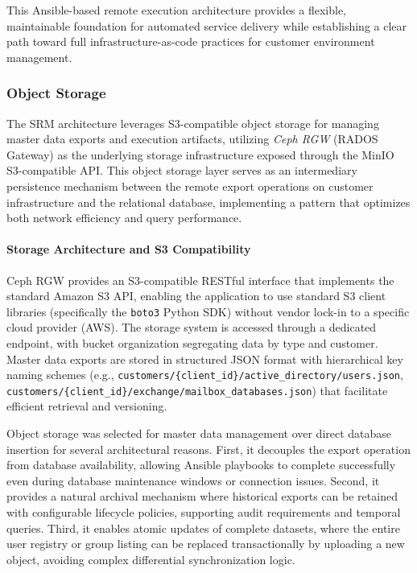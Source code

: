 This Ansible-based remote execution architecture provides a flexible, maintainable foundation for automated service delivery while establishing a clear path toward full infrastructure-as-code practices for customer environment management.

\subsubsection{Object Storage}

The SRM architecture leverages S3-compatible object storage for managing master data exports and execution artifacts, utilizing \textit{Ceph RGW} (RADOS Gateway) as the underlying storage infrastructure exposed through the MinIO S3-compatible API. This object storage layer serves as an intermediary persistence mechanism between the remote export operations on customer infrastructure and the relational database, implementing a pattern that optimizes both network efficiency and query performance.

\paragraph{Storage Architecture and S3 Compatibility}

Ceph RGW provides an S3-compatible RESTful interface that implements the standard Amazon S3 API, enabling the application to use standard S3 client libraries (specifically the \texttt{boto3} Python SDK) without vendor lock-in to a specific cloud provider (AWS). The storage system is accessed through a dedicated endpoint, with bucket organization segregating data by type and customer. Master data exports are stored in structured JSON format with hierarchical key naming schemes (e.g., \texttt{customers/\{client\_id\}/active\_directory/users.json}, \texttt{customers/\{client\_id\}/exchange/mailbox\_databases.json}) that facilitate efficient retrieval and versioning.

Object storage was selected for master data management over direct database insertion for several architectural reasons. First, it decouples the export operation from database availability, allowing Ansible playbooks to complete successfully even during database maintenance windows or connection issues. Second, it provides a natural archival mechanism where historical exports can be retained with configurable lifecycle policies, supporting audit requirements and temporal queries. Third, it enables atomic updates of complete datasets, where the entire user registry or group listing can be replaced transactionally by uploading a new object, avoiding complex differential synchronization logic.

